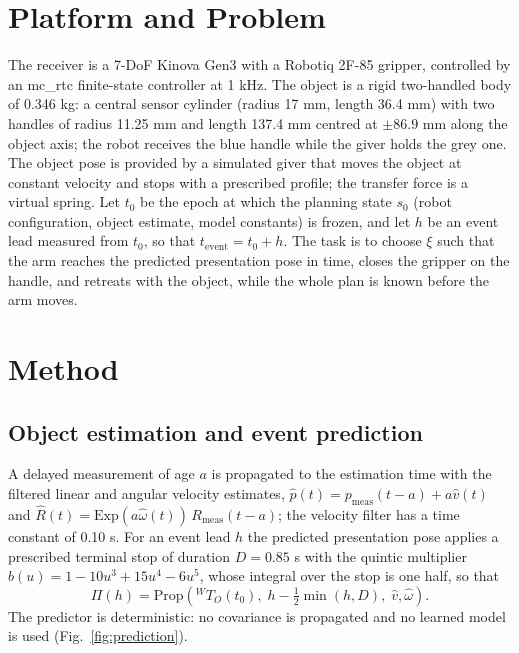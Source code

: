 \documentclass[conference]{IEEEtran}
\begin{document}
\section{Platform and Problem}\label{sec:problem}
The receiver is a 7-DoF Kinova Gen3 with a Robotiq 2F-85 gripper, controlled by an mc\_rtc finite-state controller at 1 kHz. The object is a rigid two-handled body of 0.346 kg: a central sensor cylinder (radius 17 mm, length 36.4 mm) with two handles of radius 11.25 mm and length 137.4 mm centred at $\pm86.9$ mm along the object axis; the robot receives the blue handle while the giver holds the grey one. The object pose is provided by a simulated giver that moves the object at constant velocity and stops with a prescribed profile; the transfer force is a virtual spring. Let $t_0$ be the epoch at which the planning state $s_0$ (robot configuration, object estimate, model constants) is frozen, and let $h$ be an event lead measured from $t_0$, so that $t_{\mathrm{event}} = t_0 + h$. The task is to choose $\xi$ such that the arm reaches the predicted presentation pose in time, closes the gripper on the handle, and retreats with the object, while the whole plan is known before the arm moves.

\section{Method}\label{sec:method}

\subsection{Object estimation and event prediction}\label{sec:predict}
A delayed measurement of age $a$ is propagated to the estimation time with the filtered linear and angular velocity estimates, $\hat p(t) = p_{\mathrm{meas}}(t-a) + a\hat v(t)$ and $\hat R(t) = \mathrm{Exp}(a\hat\omega(t))\,R_{\mathrm{meas}}(t-a)$; the velocity filter has a time constant of 0.10 s. For an event lead $h$ the predicted presentation pose applies a prescribed terminal stop of duration $D = 0.85$ s with the quintic multiplier $b(u) = 1 - 10u^3 + 15u^4 - 6u^5$, whose integral over the stop is one half, so that
\begin{equation}
\Pi(h) = \mathrm{Prop}\!\left({}^W\!T_O(t_0),\; h - \tfrac{1}{2}\min(h, D),\; \hat v, \hat\omega\right).
\end{equation}
The predictor is deterministic: no covariance is propagated and no learned model is used (Fig.~\ref{fig:prediction}).
\end{document}
